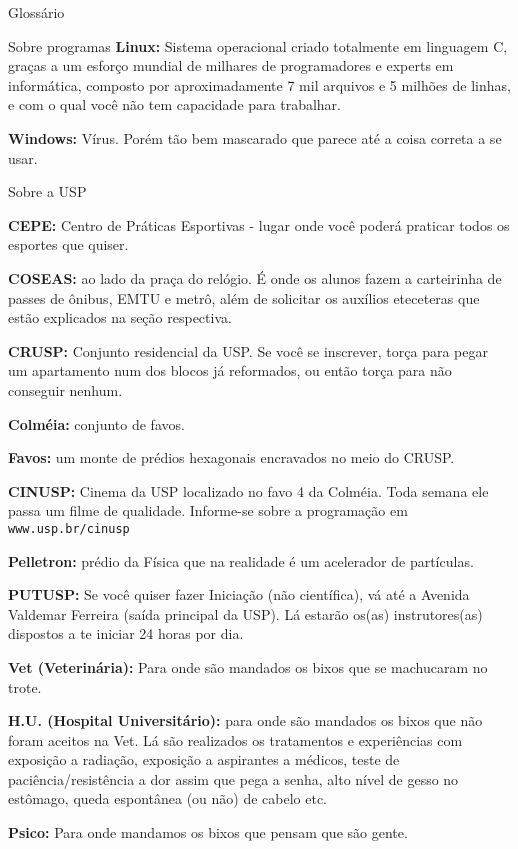 \begin{secao}{Glossário}
\begin{subsecao}{Sobre programas}
{\bf Linux:} Sistema operacional criado totalmente em linguagem C, graças a um
esforço mundial de milhares de programadores e experts em informática, composto
por aproximadamente 7 mil arquivos e 5 milhões de linhas, e com o qual você não
tem capacidade para trabalhar.

{\bf Windows:} Vírus. Porém tão bem mascarado que parece até a coisa correta a
se usar.
\end{subsecao}

\begin{subsecao}{Sobre a USP}

{\bf CEPE:} Centro de Práticas Esportivas - lugar onde você poderá praticar
todos os esportes que quiser.

{\bf COSEAS:} ao lado da praça do relógio. É onde os alunos fazem a carteirinha
de passes de ônibus, EMTU e metrô, além de solicitar os auxílios eteceteras que
estão explicados na seção respectiva.

{\bf CRUSP:} Conjunto residencial da USP. Se você se inscrever, torça para
pegar um apartamento num dos blocos já reformados, ou então torça para não
conseguir nenhum.

{\bf Colméia:} conjunto de favos.

{\bf Favos:} um monte de prédios hexagonais encravados no meio do CRUSP.

{\bf CINUSP:} Cinema da USP localizado no favo 4 da Colméia. Toda semana ele
passa um filme de qualidade. Informe-se sobre a programação em {\tt www.usp.br/cinusp}

{\bf Pelletron:} prédio da Física que na realidade é um acelerador de
partículas.

{\bf PUTUSP:} Se você quiser fazer Iniciação (não científica), vá até a
Avenida Valdemar Ferreira (saída principal da USP). Lá estarão os(as)
instrutores(as) dispostos a te iniciar 24 horas por dia.

{\bf Vet (Veterinária):} Para onde são mandados os bixos que se machucaram no
trote.

{\bf H.U. (Hospital Universitário):} para onde são mandados os bixos que não
foram aceitos na Vet. Lá são realizados os tratamentos e experiências com
exposição a radiação, exposição a aspirantes a médicos, teste de
paciência/resistência a dor assim que pega a senha, alto nível de gesso no
estômago, queda espontânea (ou não) de cabelo etc.

{\bf Psico:} Para onde mandamos os bixos que pensam que são gente.

\end{subsecao}
\end{secao}
